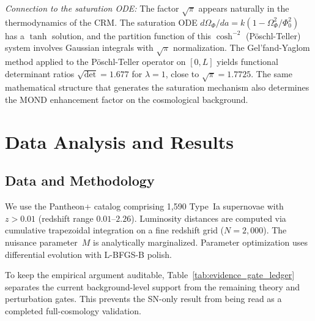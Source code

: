 \documentclass[aps,prd,twocolumn,superscriptaddress,nofootinbib]{revtex4-2}
\begin{document}
\textit{Connection to the saturation ODE:} The factor $\sqrt{\pi}$ appears naturally in the thermodynamics of the CRM. The saturation ODE $d\Omega_\Phi/da = k(1 - \Omega_\Phi^2/\Phi_0^2)$ has a $\tanh$ solution, and the partition function of this $\cosh^{-2}$ (P\"oschl-Teller) system involves Gaussian integrals with $\sqrt{\pi}$ normalization. The Gel'fand-Yaglom method applied to the P\"oschl-Teller operator on $[0,L]$ yields functional determinant ratios $\sqrt{\det} = 1.677$ for $\lambda = 1$, close to $\sqrt{\pi} = 1.7725$. The same mathematical structure that generates the saturation mechanism also determines the MOND enhancement factor on the cosmological background.


\section{Data Analysis and Results}
\label{sec:analysis}

\subsection{Data and Methodology}

We use the Pantheon+ catalog \cite{Scolnic2022} comprising 1,590 Type~Ia supernovae with $z > 0.01$ (redshift range $0.01$--$2.26$). Luminosity distances are computed via cumulative trapezoidal integration on a fine redshift grid ($N = 2{,}000$). The nuisance parameter~$M$ is analytically marginalized. Parameter optimization uses differential evolution with L-BFGS-B polish.

To keep the empirical argument auditable, Table~\ref{tab:evidence_gate_ledger} separates the current background-level support from the remaining theory and perturbation gates. This prevents the SN-only result from being read as a completed full-cosmology validation.
\end{document}
